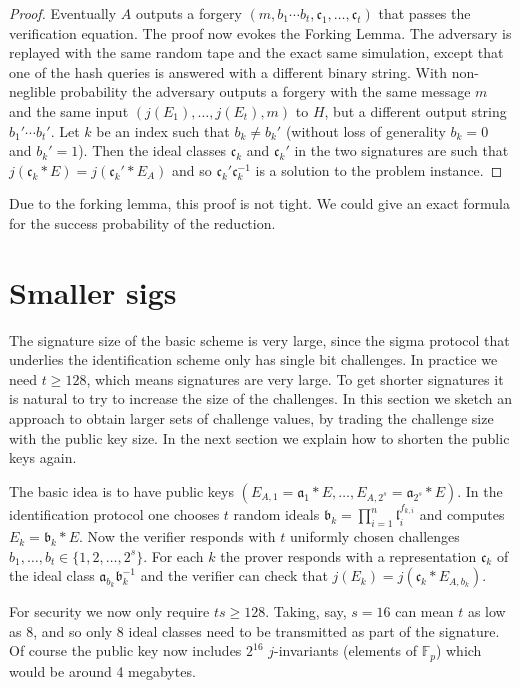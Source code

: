 \documentclass{llncs}
\newcommand{\F}{\mathbb{F}}
\renewcommand{\a}{\mathfrak{a}}
\renewcommand{\b}{\mathfrak{b}}
\renewcommand{\c}{\mathfrak{c}}
\renewcommand{\l}{\mathfrak{l}}
\begin{document}
\begin{proof}
Eventually $A$ outputs a forgery $(m, b_1\cdots b_t, \c_1, \dots, \c_t)$ that passes the verification equation.
The proof now evokes the Forking Lemma. The adversary is replayed with the same random tape and the exact same simulation, except that one of the hash queries is answered with a different binary string.
With non-neglible probability the adversary outputs a forgery with the same message $m$ and the same input $(j(E_1), \dots, j(E_t), m)$ to $H$, but a different output string $b_1'\cdots b_t'$. Let $k$ be an index such that $b_k \ne b_k'$ (without loss of generality $b_k = 0$ and $b_k' = 1$). Then the ideal classes $\c_k$ and $\c_k'$ in the two signatures are such that $j( \c_k * E ) = j( \c_k' * E_A )$ and so $\c_k' \c_k^{-1}$ is a solution to the problem instance.
\end{proof}

Due to the forking lemma, this proof is not tight. We could give an exact formula for the success probability of the reduction.



\section{Smaller sigs}


The signature size of the basic scheme is very large, since the sigma protocol that underlies the identification scheme only has single bit challenges. 
In practice we need $t \ge 128$, which means signatures are very large.
To get shorter signatures it is natural to try to increase the size of the challenges.
In this section we sketch an approach to obtain larger sets of challenge values, by trading the challenge size with the public key size. In the next section we explain how to shorten the public keys again.


The basic idea is to have public keys $( E_{A,1} = \a_1 * E , \dots , E_{A,2^s} = \a_{2^s} * E )$.
In the identification protocol one chooses $t$ random ideals $\b_k = \prod_{i=1}^n \l_i^{f_{k,i}}$ and computes $E_k = \b_k * E$.
Now the verifier responds with $t$ uniformly chosen challenges $b_1, \dots, b_t \in \{1, 2, \dots, 2^s \}$.
For each $k$ the prover responds with a representation $\c_k$ of the ideal class $\a_{b_k} \b_k^{-1}$ and the verifier can check that $j( E_k ) = j( \c_k * E_{A, b_k})$.

For security we now only require $ts \ge 128$. Taking, say, $s = 16$ can mean $t$ as low as 8, and so only 8 ideal classes need to be transmitted as part of the signature.
Of course the public key now includes $2^{16}$ $j$-invariants (elements of $\F_p$) which would be around 4 megabytes.
\end{document}
